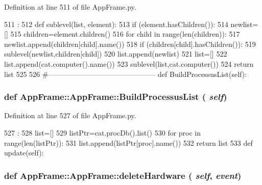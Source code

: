 Definition at line 511 of file AppFrame.py.


\begin{DoxyCode}
511                               :
512         def sublevel(list, element):
513             if (element.hasChildren()):
514                 newlist=[]
515                 children=element.children()
516                 for child in range(len(children)):
517                     newlist.append(children[child].name())
518                     if (children[child].hasChildren()):
519                         sublevel(newlist,children[child])
520                 list.append(newlist)
521         list=[]
522         list.append(cat.computer().name())
523         sublevel(list,cat.computer())
524         return list
525 
526     #---------------------------------------------
    def BuildProcessusList(self):
\end{DoxyCode}
\hypertarget{classAppFrame_1_1AppFrame_a7e349c4603f3f7ca0c5aa77a89d253dd}{
\subsubsection[{BuildProcessusList}]{\setlength{\rightskip}{0pt plus 5cm}def AppFrame::AppFrame::BuildProcessusList ( {\em self})}}
\label{classAppFrame_1_1AppFrame_a7e349c4603f3f7ca0c5aa77a89d253dd}


Definition at line 527 of file AppFrame.py.


\begin{DoxyCode}
527                                 :
528         list=[]
529         listPtr=cat.procDb().list()
530         for proc in range(len(listPtr)):
531             list.append(listPtr[proc].name())
532         return list
533         
    def update(self):
\end{DoxyCode}
\hypertarget{classAppFrame_1_1AppFrame_ae6dbfb701cee3d4f1ebd953d21934f90}{
\subsubsection[{deleteHardware}]{\setlength{\rightskip}{0pt plus 5cm}def AppFrame::AppFrame::deleteHardware ( {\em self}, \/   {\em event})}}
\label{classAppFrame_1_1AppFrame_ae6dbfb701cee3d4f1ebd953d21934f90}


